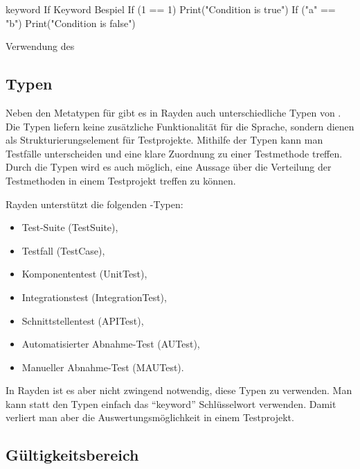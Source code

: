 \begin{program}
\begin{JavaCode}
keyword If Keyword Bespiel {
	If (1 == 1){
		Print("Condition is true")
	}
	If ("a" == "b"){
		Print("Condition is false")
	}
}
\end{JavaCode}
\caption{Verwendung des }
\label{prog:ifKeywordUsage}
\end{program}

\subsection{Typen}
\label{cha:KeywordTypes}

Neben den Metatypen für  gibt es in Rayden auch unterschiedliche Typen von . Die Typen liefern keine zusätzliche Funktionalität für die Sprache, sondern dienen als Strukturierungselement für Testprojekte. Mithilfe der Typen kann man Testfälle unterscheiden und eine klare Zuordnung zu einer Testmethode treffen. Durch die Typen wird es auch möglich, eine Aussage über die Verteilung der Testmethoden in einem Testprojekt treffen zu können. 

\SuperPar
Rayden unterstützt die folgenden -Typen:

\begin{itemize}
\item Test-Suite (TestSuite),
\item Testfall (TestCase),
\item Komponententest (UnitTest),
\item Integrationstest (IntegrationTest),
\item Schnittstellentest (APITest),
\item Automatisierter Abnahme-Test (AUTest),
\item Manueller Abnahme-Test (MAUTest).
\end{itemize}

\SuperPar
In Rayden ist es aber nicht zwingend notwendig, diese Typen zu verwenden. Man kann statt den Typen einfach das "`keyword"' Schlüsselwort verwenden. Damit verliert man aber die Auswertungsmöglichkeit in einem Testprojekt. 

\subsection{Gültigkeitsbereich}
\label{cha:KeywordScope}

